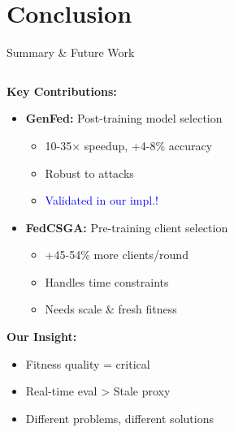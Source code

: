 \documentclass{beamer}
\begin{document}
\section{Conclusion}

\begin{frame}{Summary \& Future Work}
\begin{columns}[T]
\begin{column}{0.48\textwidth}
\textbf{Key Contributions:}
\begin{itemize}
\item \textbf{GenFed:} Post-training model selection
  \begin{itemize}
  \scriptsize
  \item 10-35× speedup, +4-8\% accuracy
  \item Robust to attacks
  \item \textcolor{blue}{Validated in our impl.!}
  \end{itemize}
\item \textbf{FedCSGA:} Pre-training client selection
  \begin{itemize}
  \scriptsize
  \item +45-54\% more clients/round
  \item Handles time constraints
  \item Needs scale \& fresh fitness
  \end{itemize}
\end{itemize}

\textbf{Our Insight:}
\begin{itemize}
\scriptsize
\item Fitness quality = critical
\item Real-time eval > Stale proxy
\item Different problems, different solutions
\end{itemize}
\end{column}


\end{columns}
\end{frame}
\end{document}
